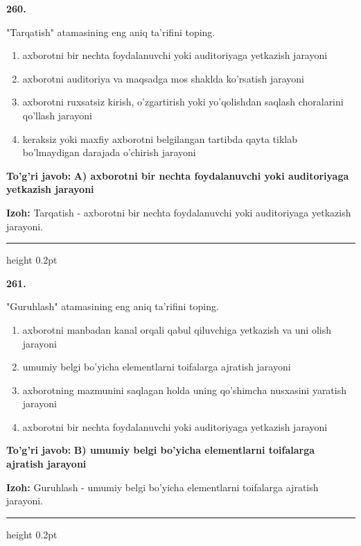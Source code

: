 \documentclass[10pt,a4paper,oneside]{article}
\begin{document}
\noindent\textbf{\color{ink}260.}
\par
"Tarqatish" atamasining eng aniq ta'rifini toping.
\begin{enumerate}[label=\Alph*),leftmargin=9mm]
\item axborotni bir nechta foydalanuvchi yoki auditoriyaga yetkazish jarayoni
\item axborotni auditoriya va maqsadga mos shaklda ko'rsatish jarayoni
\item axborotni ruxsatsiz kirish, o'zgartirish yoki yo'qolishdan saqlash choralarini qo'llash jarayoni
\item keraksiz yoki maxfiy axborotni belgilangan tartibda qayta tiklab bo'lmaydigan darajada o'chirish jarayoni
\end{enumerate}
\begin{tcolorbox}[enhanced,breakable,colback=teal!4,colframe=teal!50!black,boxrule=0.5pt,arc=1.1mm,left=3mm,right=3mm,top=1.7mm,bottom=1.7mm,before skip=2mm,after skip=2mm]
\textbf{\color{teal}To'g'ri javob:} \textbf{A) axborotni bir nechta foydalanuvchi yoki auditoriyaga yetkazish jarayoni}
\par\smallskip
\textbf{Izoh:} Tarqatish - axborotni bir nechta foydalanuvchi yoki auditoriyaga yetkazish jarayoni.
\end{tcolorbox}
\vspace{2mm}\hrule height 0.2pt \vspace{3mm}

\noindent\textbf{\color{ink}261.}
\par
"Guruhlash" atamasining eng aniq ta'rifini toping.
\begin{enumerate}[label=\Alph*),leftmargin=9mm]
\item axborotni manbadan kanal orqali qabul qiluvchiga yetkazish va uni olish jarayoni
\item umumiy belgi bo'yicha elementlarni toifalarga ajratish jarayoni
\item axborotning mazmunini saqlagan holda uning qo'shimcha nusxasini yaratish jarayoni
\item axborotni bir nechta foydalanuvchi yoki auditoriyaga yetkazish jarayoni
\end{enumerate}
\begin{tcolorbox}[enhanced,breakable,colback=teal!4,colframe=teal!50!black,boxrule=0.5pt,arc=1.1mm,left=3mm,right=3mm,top=1.7mm,bottom=1.7mm,before skip=2mm,after skip=2mm]
\textbf{\color{teal}To'g'ri javob:} \textbf{B) umumiy belgi bo'yicha elementlarni toifalarga ajratish jarayoni}
\par\smallskip
\textbf{Izoh:} Guruhlash - umumiy belgi bo'yicha elementlarni toifalarga ajratish jarayoni.
\end{tcolorbox}
\vspace{2mm}\hrule height 0.2pt \vspace{3mm}
\end{document}
